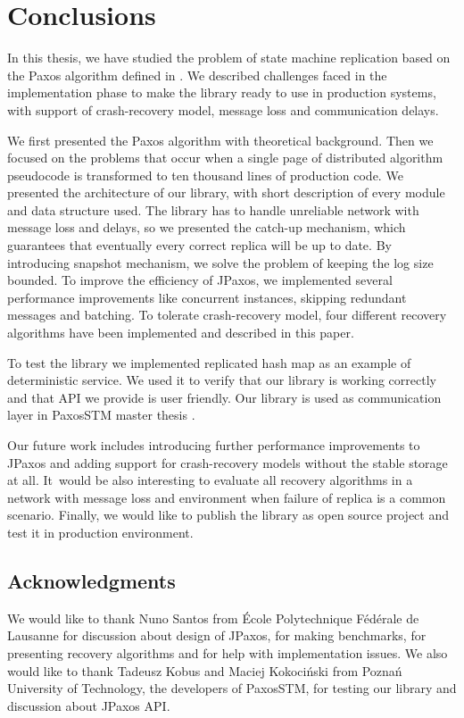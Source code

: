 \chapter{Conclusions}

In this thesis, we have studied the problem of state machine replication based
on the Paxos algorithm defined in \cite{Lam98}. We described challenges faced in
the implementation phase to make the library ready to use in production systems,
with support of crash-recovery model, message loss and communication delays.

We first presented the Paxos algorithm with theoretical background. Then we
focused on the problems that occur when a single page of distributed algorithm pseudocode 
is transformed to ten thousand lines of production code. We presented
the architecture of our library, with short description of every module and data
structure used. The library has to handle unreliable network with message
loss and delays, so we presented the catch-up mechanism, which guarantees that
eventually every correct replica will be up to date. By introducing snapshot
mechanism, we solve the problem of keeping the log size bounded. To improve the efficiency of JPaxos, we implemented several performance improvements like concurrent
instances, skipping redundant messages and batching. To tolerate crash-recovery
model, four different recovery algorithms have been implemented and described in
this paper.

To test the library we implemented replicated hash map as an example of
deterministic service. We used it to verify that our library is working
correctly and that API we provide is user friendly. Our library is used as 
communication layer in PaxosSTM master thesis \cite{Tad10}.

Our future work includes introducing further performance improvements to JPaxos and
adding support for crash-recovery models without the stable storage at all. It~would be also interesting to evaluate all recovery algorithms in a network with
message loss and environment when failure of replica is a common scenario.
Finally, we would like to publish the library as open source project and test it
in production environment.

\section*{Acknowledgments}

\noindent We would like to thank Nuno Santos from École Polytechnique Fédérale de Lausanne for discussion about design of JPaxos, for making benchmarks, for presenting recovery algorithms and for help with implementation issues. We also would like to thank Tadeusz Kobus and Maciej Kokociński from Poznań University of Technology, the developers of PaxosSTM, for testing our library and discussion about JPaxos API.

\cleardoublepage
